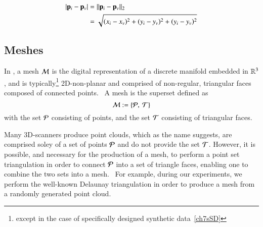 \begin{equation}
\begin{aligned}
	|\mathbf{p}_i - \mathbf{p}_v| & = \lVert\mathbf{p}_i - \mathbf{p}_v\rVert_2 \\
					& = \sqrt{(x_i-x_v)^2 + (y_i-y_v)^2 + (y_i-y_v)^2}
	\label{eq:defineEdgeLengthCalc}
\end{aligned}
\end{equation}

%
%
%
\subsection{Meshes}
\label{ch2s3ssM}
In \tdd{}, a mesh $\mathcal{M}$ is the digital representation of a discrete manifold embedded in $\mathbb{R}^{3}$, and is typically\footnote{except in the case of specifically designed synthetic data~\ref{ch7sSD}} 2D-non-planar and comprised of non-regular, triangular faces composed of connected points.~\cite[p.~25]{Mara12} A mesh is the superset defined as
%
\begin{equation}
	\mathcal{M} := \left \{\mathcal{P},\:\mathcal{T}\right \}
	\label{eq:defineMesh}
\end{equation}%
%
%
with the set $\mathcal{P}$ consisting of points, and the set $\mathcal{T}$ consisting of triangular faces.

Many 3D-scanners produce point clouds, which as the name suggests, are comprised soley of a set of points $\mathcal{P}$ and do not provide the set $\mathcal{T}$. However, it is possible, and necessary for the production of a mesh, to perform a point set triangulation in order to connect $\mathcal{P}$ into a set of triangle faces, enabling one to combine the two sets into a mesh.~\cite[p.~26]{Mara12} For example, during our experiments, we perform the well-known Delaunay triangulation in order to produce a mesh from a randomly generated point cloud.

%
%
%
